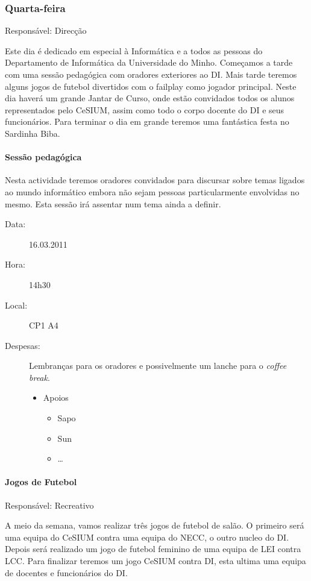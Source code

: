 \subsubsection*{Quarta-feira}
Responsável: Direcção

Este dia é dedicado em especial à Informática e a todos as pessoas do Departamento de Informática da Universidade do Minho.
Começamos a tarde com uma sessão pedagógica com oradores exteriores ao DI. Mais tarde teremos alguns jogos de futebol divertidos com o failplay como jogador principal. Neste dia haverá um grande Jantar de Curso, onde estão convidados todos os alunos representados pelo CeSIUM, assim como todo o corpo docente do DI e seus funcionários. Para terminar o dia em grande teremos uma fantástica festa no Sardinha Biba.

\paragraph{Sessão pedagógica}
Nesta actividade teremos oradores convidados para discursar sobre temas ligados ao mundo informático embora não sejam pessoas particularmente envolvidas no mesmo. Esta sessão irá assentar num tema ainda a definir.

\begin{description}
	\item[Data:] 16.03.2011
	\item[Hora:] 14h30
	\item[Local:] CP1 A4
	\item[Despesas:] Lembranças para os oradores e possivelmente um lanche para o \emph{coffee break}.
	\begin{itemize}
		\item Apoios
		\begin{itemize}
			\item Sapo
			\item Sun
			\item \dots  
		\end{itemize}
	\end{itemize}
\end{description}


\paragraph{Jogos de Futebol}
Responsável: Recreativo

A meio da semana, vamos realizar três jogos de futebol de salão. O primeiro será uma equipa do CeSIUM contra uma equipa do NECC, o outro nucleo do DI. Depois será realizado um jogo de futebol feminino de uma equipa de LEI contra LCC. Para finalizar teremos um jogo CeSIUM contra DI, esta ultima uma equipa de docentes e funcionários do DI.

